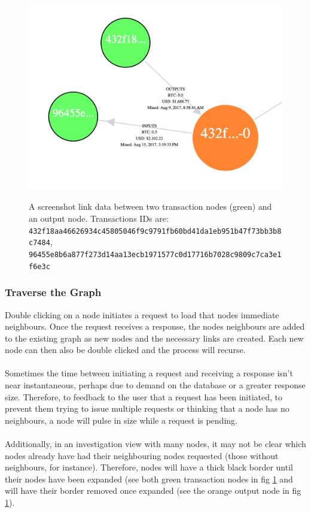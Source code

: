 \begin{figure}[h!]
  \centering
  \includegraphics[width = 15cm]{./figures/ui-screenshots/link-data}\\[0.5cm] 
  \caption{A screenshot link data between two transaction nodes (green) and an output node. 
  Transactions IDs are: \texttt{432f18aa46626934c45805046f9c9791fb60bd41da1eb951b47f73bb3b8c7484},\\\texttt{96455e8b6a877f273d14aa13ecb1971577c0d17716b7028c9809c7ca3e1f6e3c}}
  \label{fig:link-data}
\end{figure}

\subsubsection{Traverse the Graph}
Double clicking on a node initiates a request to load that nodes immediate neighbours. Once the request receives a response, the nodes neighbours are added to the existing graph as new nodes and the necessary links are created. Each new node can then also be double clicked and the process will recurse. 
\\\\
Sometimes the time between initiating a request and receiving a response isn't near instantaneous, perhaps due to demand on the database or a greater response size. Therefore, to feedback to the user that a request has been initiated, to prevent them trying to issue multiple requests or thinking that a node has no neighbours, a node will pulse in size while a request is pending. 
\\\\
Additionally, in an investigation view with many nodes, it may not be clear which nodes already have had their neighbouring nodes requested (those without neighbours, for instance). Therefore, nodes will have a thick black border until their nodes have been expanded (see both green transaction nodes in fig \ref{fig:link-data} and will have their border removed once expanded (see the orange output node in fig \ref{fig:link-data}).

